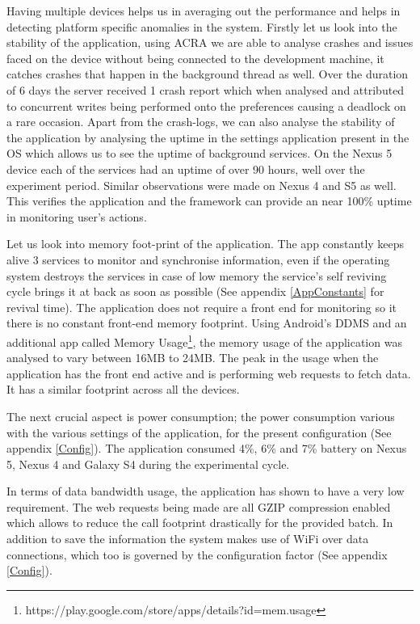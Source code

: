 \documentclass[12pt]{report}
\begin{document}
Having multiple devices helps us in averaging out the performance and helps in detecting platform specific anomalies in the system. Firstly let us look into the stability of the application, using ACRA we are able to analyse crashes and issues faced on the device without being connected to the development machine, it catches crashes that happen in the background thread as well. Over the duration of 6 days the server received 1 crash report which when analysed and attributed to concurrent writes being performed onto the preferences causing a deadlock on a rare occasion. Apart from the crash-logs, we can also analyse the stability of the application by analysing the uptime in the settings application present in the OS which allows us to see the uptime of background services. On the Nexus 5 device each of the services had an uptime of over 90 hours, well over the experiment period. Similar observations were made on Nexus 4 and S5 as well. This verifies the application and the framework can provide an near 100\% uptime in monitoring user's actions.

Let us look into memory foot-print of the application. The app constantly keeps alive 3 services to monitor and synchronise information, even if the operating system destroys the services in case of low memory \cite{AndroidAppLifeCycle} the service's self reviving cycle brings it at back as soon as possible (See appendix \ref{AppConstants} for revival time). The application does not require a front end for monitoring so it there is no constant front-end memory footprint. Using Android's DDMS \cite{AndroidDDMS} and an additional app called Memory Usage\footnote{https://play.google.com/store/apps/details?id=mem.usage}, the memory usage of the application was analysed to vary between 16MB to 24MB. The peak in the usage when the application has the front end active and is performing web requests to fetch data. It has a similar footprint across all the devices.

The next crucial aspect is power consumption; the power consumption various with the various settings of the application, for the present configuration (See appendix \ref{Config}). The application consumed 4\%, 6\% and 7\% battery on Nexus 5, Nexus 4 and Galaxy S4 during the experimental cycle.

In terms of data bandwidth usage, the application has shown to have a very low requirement. The web requests being made are all GZIP compression enabled which allows to reduce the call footprint drastically for the provided batch. In addition to save the information the system makes use of WiFi over data connections, which too is governed by the configuration factor (See appendix \ref{Config}).
\end{document}
